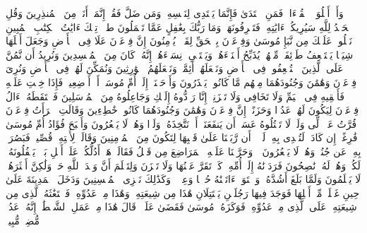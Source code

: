 \startbuffer[\q:27:92]
وَأَنۡ أَتۡلُوَا۟ ٱلۡقُرۡءَانَۖ فَمَنِ ٱهۡتَدَىٰ فَإِنَّمَا یَهۡتَدِی لِنَفۡسِهِۦۖ وَمَن ضَلَّ فَقُلۡ إِنَّمَاۤ أَنَا۠ مِنَ ٱلۡمُنذِرِینَ%
\stopbuffer%
\startbuffer[\q:27:93]
وَقُلِ ٱلۡحَمۡدُ لِلَّهِ سَیُرِیكُمۡ ءَایَٰتِهِۦ فَتَعۡرِفُونَهَاۚ وَمَا رَبُّكَ بِغَٰفِلٍ عَمَّا تَعۡمَلُونَ%
\stopbuffer%
\startbuffer[\q:28:1]
طسۤمۤ%
\stopbuffer%
\startbuffer[\q:28:2]
تِلۡكَ ءَایَٰتُ ٱلۡكِتَٰبِ ٱلۡمُبِینِ%
\stopbuffer%
\startbuffer[\q:28:3]
نَتۡلُوا۟ عَلَیۡكَ مِن نَّبَإِ مُوسَىٰ وَفِرۡعَوۡنَ بِٱلۡحَقِّ لِقَوۡمࣲ یُؤۡمِنُونَ%
\stopbuffer%
\startbuffer[\q:28:4]
إِنَّ فِرۡعَوۡنَ عَلَا فِی ٱلۡأَرۡضِ وَجَعَلَ أَهۡلَهَا شِیَعࣰا یَسۡتَضۡعِفُ طَاۤئِفَةࣰ مِّنۡهُمۡ یُذَبِّحُ أَبۡنَاۤءَهُمۡ وَیَسۡتَحۡیِۦ نِسَاۤءَهُمۡۚ إِنَّهُۥ كَانَ مِنَ ٱلۡمُفۡسِدِینَ%
\stopbuffer%
\startbuffer[\q:28:5]
وَنُرِیدُ أَن نَّمُنَّ عَلَى ٱلَّذِینَ ٱسۡتُضۡعِفُوا۟ فِی ٱلۡأَرۡضِ وَنَجۡعَلَهُمۡ أَئِمَّةࣰ وَنَجۡعَلَهُمُ ٱلۡوَٰرِثِینَ%
\stopbuffer%
\startbuffer[\q:28:6]
وَنُمَكِّنَ لَهُمۡ فِی ٱلۡأَرۡضِ وَنُرِیَ فِرۡعَوۡنَ وَهَٰمَٰنَ وَجُنُودَهُمَا مِنۡهُم مَّا كَانُوا۟ یَحۡذَرُونَ%
\stopbuffer%
\startbuffer[\q:28:7]
وَأَوۡحَیۡنَاۤ إِلَىٰۤ أُمِّ مُوسَىٰۤ أَنۡ أَرۡضِعِیهِۖ فَإِذَا خِفۡتِ عَلَیۡهِ فَأَلۡقِیهِ فِی ٱلۡیَمِّ وَلَا تَخَافِی وَلَا تَحۡزَنِیۤۖ إِنَّا رَاۤدُّوهُ إِلَیۡكِ وَجَاعِلُوهُ مِنَ ٱلۡمُرۡسَلِینَ%
\stopbuffer%
\startbuffer[\q:28:8]
فَٱلۡتَقَطَهُۥۤ ءَالُ فِرۡعَوۡنَ لِیَكُونَ لَهُمۡ عَدُوࣰّا وَحَزَنًاۗ إِنَّ فِرۡعَوۡنَ وَهَٰمَٰنَ وَجُنُودَهُمَا كَانُوا۟ خَٰطِءِینَ%
\stopbuffer%
\startbuffer[\q:28:9]
وَقَالَتِ ٱمۡرَأَتُ فِرۡعَوۡنَ قُرَّتُ عَیۡنࣲ لِّی وَلَكَۖ لَا تَقۡتُلُوهُ عَسَىٰۤ أَن یَنفَعَنَاۤ أَوۡ نَتَّخِذَهُۥ وَلَدࣰا وَهُمۡ لَا یَشۡعُرُونَ%
\stopbuffer%
\startbuffer[\q:28:10]
وَأَصۡبَحَ فُؤَادُ أُمِّ مُوسَىٰ فَٰرِغًاۖ إِن كَادَتۡ لَتُبۡدِی بِهِۦ لَوۡلَاۤ أَن رَّبَطۡنَا عَلَىٰ قَلۡبِهَا لِتَكُونَ مِنَ ٱلۡمُؤۡمِنِینَ%
\stopbuffer%
\startbuffer[\q:28:11]
وَقَالَتۡ لِأُخۡتِهِۦ قُصِّیهِۖ فَبَصُرَتۡ بِهِۦ عَن جُنُبࣲ وَهُمۡ لَا یَشۡعُرُونَ%
\stopbuffer%
\startbuffer[\q:28:12]
۞ وَحَرَّمۡنَا عَلَیۡهِ ٱلۡمَرَاضِعَ مِن قَبۡلُ فَقَالَتۡ هَلۡ أَدُلُّكُمۡ عَلَىٰۤ أَهۡلِ بَیۡتࣲ یَكۡفُلُونَهُۥ لَكُمۡ وَهُمۡ لَهُۥ نَٰصِحُونَ%
\stopbuffer%
\startbuffer[\q:28:13]
فَرَدَدۡنَٰهُ إِلَىٰۤ أُمِّهِۦ كَیۡ تَقَرَّ عَیۡنُهَا وَلَا تَحۡزَنَ وَلِتَعۡلَمَ أَنَّ وَعۡدَ ٱللَّهِ حَقࣱّ وَلَٰكِنَّ أَكۡثَرَهُمۡ لَا یَعۡلَمُونَ%
\stopbuffer%
\startbuffer[\q:28:14]
وَلَمَّا بَلَغَ أَشُدَّهُۥ وَٱسۡتَوَىٰۤ ءَاتَیۡنَٰهُ حُكۡمࣰا وَعِلۡمࣰاۚ وَكَذَٰلِكَ نَجۡزِی ٱلۡمُحۡسِنِینَ%
\stopbuffer%
\startbuffer[\q:28:15]
وَدَخَلَ ٱلۡمَدِینَةَ عَلَىٰ حِینِ غَفۡلَةࣲ مِّنۡ أَهۡلِهَا فَوَجَدَ فِیهَا رَجُلَیۡنِ یَقۡتَتِلَانِ هَٰذَا مِن شِیعَتِهِۦ وَهَٰذَا مِنۡ عَدُوِّهِۦۖ فَٱسۡتَغَٰثَهُ ٱلَّذِی مِن شِیعَتِهِۦ عَلَى ٱلَّذِی مِنۡ عَدُوِّهِۦ فَوَكَزَهُۥ مُوسَىٰ فَقَضَىٰ عَلَیۡهِۖ قَالَ هَٰذَا مِنۡ عَمَلِ ٱلشَّیۡطَٰنِۖ إِنَّهُۥ عَدُوࣱّ مُّضِلࣱّ مُّبِینࣱ%

